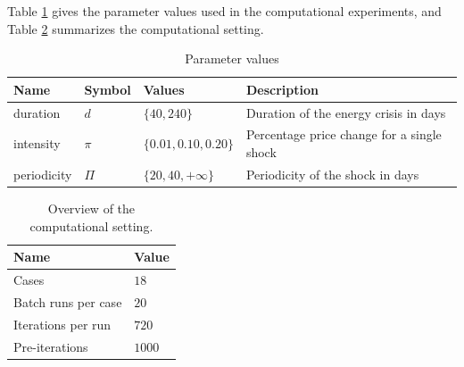 Table \ref{Table: parameter settings} gives the parameter values used in the
computational experiments, and Table \ref{Table: computational setting} summarizes the computational
setting.

\begin{table}[tbp]
\caption{Parameter values}
\centering
\begin{tabular}{llll}
\hline\hline
Name & Symbol & Values & Description \\ \hline
duration & $d$ & $\{40, 240\}$ & Duration of the energy crisis in days \\
intensity & $\pi$ & $\{0.01, 0.10, 0.20\}$ & Percentage price change for a
single shock \\
periodicity & $\Pi$ & $\{20, 40, +\infty\}$ & Periodicity of the shock in days%
\end{tabular}%
\label{Table: parameter settings}
\end{table}

\begin{table}[tbp]
\caption{Overview of the computational setting.}
\label{Table: computational setting}
\centering
\begin{tabular}{ll}
\hline\hline
Name & Value \\ \hline
Cases & $18$ \\
Batch runs per case & $20$ \\
Iterations per run & $720$ \\
Pre-iterations & $1000$ \\ \hline
\end{tabular}%
\end{table}
